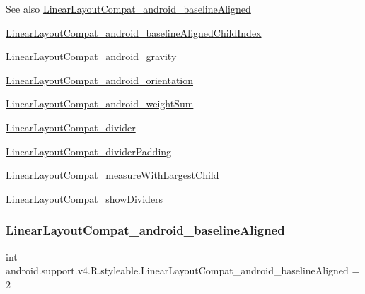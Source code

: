 \begin{DoxySeeAlso}{See also}
\hyperlink{classandroid_1_1support_1_1v4_1_1R_1_1styleable_ad642c125826d2bed7ae25860cafd6edd}{Linear\+Layout\+Compat\+\_\+android\+\_\+baseline\+Aligned} 

\hyperlink{classandroid_1_1support_1_1v4_1_1R_1_1styleable_a2c50eb551dc4f5ea5db0ac221a8ca0d7}{Linear\+Layout\+Compat\+\_\+android\+\_\+baseline\+Aligned\+Child\+Index} 

\hyperlink{classandroid_1_1support_1_1v4_1_1R_1_1styleable_aa1757dce9a8d990b61214a54ba88e2fc}{Linear\+Layout\+Compat\+\_\+android\+\_\+gravity} 

\hyperlink{classandroid_1_1support_1_1v4_1_1R_1_1styleable_a5b67b845c7e37a891973d4715fc0baeb}{Linear\+Layout\+Compat\+\_\+android\+\_\+orientation} 

\hyperlink{classandroid_1_1support_1_1v4_1_1R_1_1styleable_a60122618908d765ecf7a6397f21a692a}{Linear\+Layout\+Compat\+\_\+android\+\_\+weight\+Sum} 

\hyperlink{classandroid_1_1support_1_1v4_1_1R_1_1styleable_ad062fe8676838d9c14d62ca0905d04c7}{Linear\+Layout\+Compat\+\_\+divider} 

\hyperlink{classandroid_1_1support_1_1v4_1_1R_1_1styleable_af6bd9621cf5c129d0028c9ac57569dc4}{Linear\+Layout\+Compat\+\_\+divider\+Padding} 

\hyperlink{classandroid_1_1support_1_1v4_1_1R_1_1styleable_ae97a8388a99dc364d8df2d275288477c}{Linear\+Layout\+Compat\+\_\+measure\+With\+Largest\+Child} 

\hyperlink{classandroid_1_1support_1_1v4_1_1R_1_1styleable_abca207974c64d98f9f476c69a829e50e}{Linear\+Layout\+Compat\+\_\+show\+Dividers} 
\end{DoxySeeAlso}
\mbox{\label{classandroid_1_1support_1_1v4_1_1R_1_1styleable_ad642c125826d2bed7ae25860cafd6edd}} 
\subsubsection{\texorpdfstring{Linear\+Layout\+Compat\+\_\+android\+\_\+baseline\+Aligned}{LinearLayoutCompat\_android\_baselineAligned}}
{\footnotesize\ttfamily int android.\+support.\+v4.\+R.\+styleable.\+Linear\+Layout\+Compat\+\_\+android\+\_\+baseline\+Aligned = 2\hspace{0.3cm}{\ttfamily [static]}}


